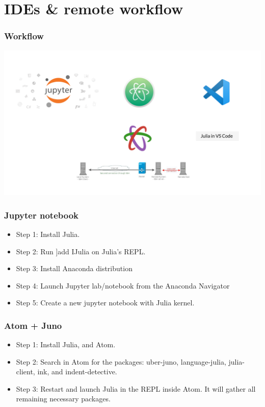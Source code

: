 \documentclass{beamer}
\DeclareRobustCommand\PICINTOC{}%
\begin{document}
\section{IDEs \& remote workflow \PICINTOC}

\begin{frame}
\frametitle{Workflow}
\centering
\includegraphics[width=\paperwidth,trim={7cm 5cm 4cm 5cm},clip]{IDEs&remote.png}
\end{frame}

\begin{frame}
\frametitle{Jupyter notebook}
\begin{itemize}
\item Step 1: Install Julia.
\item Step 2: Run ]add IJulia on Julia's REPL.
\item Step 3: Install Anaconda distribution
\item Step 4: Launch Jupyter lab/notebook from the Anaconda Navigator
\item Step 5: Create a new jupyter notebook with Julia kernel.
\end{itemize}
\end{frame}

\begin{frame}
\frametitle{Atom + Juno}
\begin{itemize}
\item Step 1: Install Julia, and Atom.
\item Step 2: Search in Atom for the packages: uber-juno, language-julia, julia-client, ink, and indent-detective.
\item Step 3: Restart and launch Julia in the REPL inside Atom. It will gather all remaining necessary packages.
\end{itemize}
\end{frame}
\end{document}
